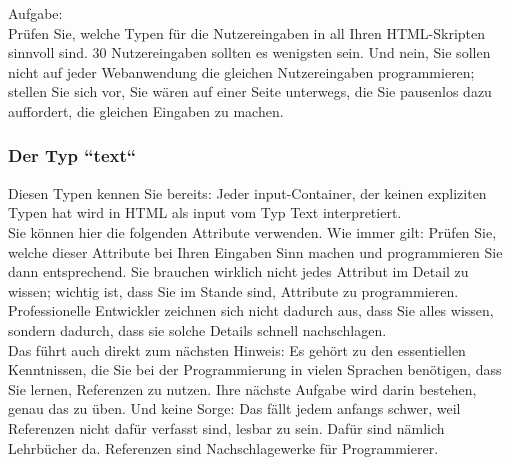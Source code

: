 Aufgabe:\\

Prüfen Sie, welche Typen für die Nutzereingaben in all Ihren HTML-Skripten sinnvoll sind. 30 Nutzereingaben sollten es wenigsten sein. Und nein, Sie sollen nicht auf jeder Webanwendung die gleichen Nutzereingaben programmieren; stellen Sie sich vor, Sie wären auf einer Seite unterwegs, die Sie pausenlos dazu auffordert, die gleichen Eingaben zu machen.

\subsubsection{Der Typ ``text``}

Diesen Typen kennen Sie bereits: Jeder input-Container, der keinen expliziten Typen hat wird in HTML als input vom Typ Text interpretiert.\\

Sie können hier die folgenden Attribute verwenden. Wie immer gilt: Prüfen Sie, welche dieser Attribute bei Ihren Eingaben Sinn machen und programmieren Sie dann entsprechend. Sie brauchen wirklich nicht jedes Attribut im Detail zu wissen; wichtig ist, dass Sie im Stande sind, Attribute zu programmieren. Professionelle Entwickler zeichnen sich nicht dadurch aus, dass Sie alles wissen, sondern dadurch, dass sie solche Details schnell nachschlagen.\\

Das führt auch direkt zum nächsten Hinweis: Es gehört zu den essentiellen Kenntnissen, die Sie bei der Programmierung in vielen Sprachen benötigen, dass Sie lernen, Referenzen zu nutzen. Ihre nächste Aufgabe wird darin bestehen, genau das zu üben. Und keine Sorge: Das fällt jedem anfangs schwer, weil Referenzen nicht dafür verfasst sind, lesbar zu sein. Dafür sind nämlich Lehrbücher da. Referenzen sind Nachschlagewerke für Programmierer.\\

